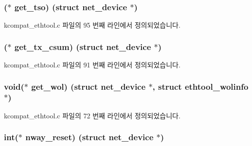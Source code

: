 \subsubsection[{\texorpdfstring{get\+\_\+tso}{get_tso}}]{($\ast$ get\+\_\+tso) (struct net\+\_\+device $\ast$)}\hypertarget{struct__kc__ethtool__ops_a553b9599a3f9fff1f4081070f7d4e504}{}\label{struct__kc__ethtool__ops_a553b9599a3f9fff1f4081070f7d4e504}


kcompat\+\_\+ethtool.\+c 파일의 95 번째 라인에서 정의되었습니다.

\subsubsection[{\texorpdfstring{get\+\_\+tx\+\_\+csum}{get_tx_csum}}]{($\ast$ get\+\_\+tx\+\_\+csum) (struct net\+\_\+device $\ast$)}\hypertarget{struct__kc__ethtool__ops_aff9d1a68d0b5f9f0c90ad732ceb1e46b}{}\label{struct__kc__ethtool__ops_aff9d1a68d0b5f9f0c90ad732ceb1e46b}


kcompat\+\_\+ethtool.\+c 파일의 91 번째 라인에서 정의되었습니다.

\subsubsection[{\texorpdfstring{get\+\_\+wol}{get_wol}}]{\setlength{\rightskip}{0pt plus 5cm}void($\ast$ get\+\_\+wol) (struct net\+\_\+device $\ast$, struct {\bf ethtool\+\_\+wolinfo} $\ast$)}\hypertarget{struct__kc__ethtool__ops_a9dc2c99cbbe1e7f69d5e2a223703ac57}{}\label{struct__kc__ethtool__ops_a9dc2c99cbbe1e7f69d5e2a223703ac57}


kcompat\+\_\+ethtool.\+c 파일의 72 번째 라인에서 정의되었습니다.

\subsubsection[{\texorpdfstring{nway\+\_\+reset}{nway_reset}}]{\setlength{\rightskip}{0pt plus 5cm}int($\ast$ nway\+\_\+reset) (struct net\+\_\+device $\ast$)}\hypertarget{struct__kc__ethtool__ops_aa0df855b8339889a8e8a7e1a7f3881ac}{}\label{struct__kc__ethtool__ops_aa0df855b8339889a8e8a7e1a7f3881ac}


